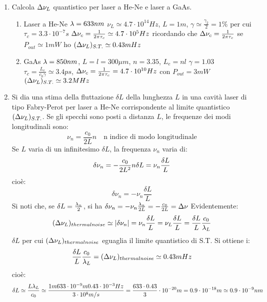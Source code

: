 \begin{enumerate}
\item Calcola $\Delta\nu_L$ quantistico per laser a He-Ne e laser a GaAs.
\begin{enumerate}
\item Laser a He-Ne $\lambda = 633nm$ $\nu_L \simeq 4.7\cdot 10^{14} Hz$, $L = 1m$, $\gamma \simeq \frac{\gamma_2}{2} = 1\%$ per cui $\tau_c = 3.3 \cdot 10^{-7} s$ $\Delta\nu_c = \frac{1}{2\pi \tau_c} \simeq 4.7 \cdot 10^5 Hz$ ricordando che $\Delta\nu_c = \frac{1}{2\pi\tau_c}$ se $P_{out} \simeq 1mW$ ho $(\Delta\nu_L)_{S.T.} \simeq 0.43 mHz$
\item GaAs $\lambda = 850 nm$, $L = l = 300 \mu m$, $n= 3.35$, $L_e=nl$ $\gamma = 1.03$ $\tau_c = \frac{L_e}{c_0 \gamma} \simeq 3.4 ps$, $\Delta\nu_c = \frac{1}{2\pi \tau_c} = 4.7 \cdot 10^{10} Hz$
con $P_{out} = 3mW$ $(\Delta\nu_L)_{S.T.} \simeq 3.2 MHz$
\end{enumerate}
\item Si dia una stima della fluttazione $\delta L$ della lunghezza $L$ in una cavità laser di tipo Fabry-Perot per laser a He-Ne corrispondente al limite quantistico $(\Delta\nu_L)_{S.T.}$. Se gli specchi sono posti a distanza $L$, le frequenze dei modi longitudinali sono:
\begin{equation*}
\nu_n = \frac{c_0}{2L} n \quad \text{n indice di modo longitudinale}
\end{equation*}
Se $L$ varia di un infinitesimo $\delta L$, la frequenza $\nu_n$ varia di:
\begin{equation*}
\delta \nu_n = -\frac{c_0}{2L^2} n \delta L = \-\nu_n \frac{\delta L}{L}
\end{equation*}
cioè:
\begin{equation*}
\delta \nu_n = -\nu_n \frac{\delta L}{L}
\end{equation*}
Si noti che, se $\delta L = \frac{\lambda_n}{2}$, si ha $\delta \nu_n= - \nu_n \frac{\lambda_n}{2L} = -\frac{c_0}{2L} = \Delta \nu$
Evidentemente:
\begin{equation*}
(\Delta\nu_L)_{thermal noise} \simeq |\delta \nu_n| = \nu_n \frac{\delta L}{L} = \nu_L\frac{\delta L}{L} = \frac{\delta L}{L} \frac{c_0}{\lambda_L}
\end{equation*}
$\delta L$ per cui $(\Delta\nu_L)_{thermal noise}$ eguaglia il limite quantistico di S.T.
Si ottiene i:
\begin{equation*}
\frac{\delta L}{L} \frac{c_0}{\lambda_L} = (\Delta\nu_L)_{thermal noise} \simeq 0.43 mHz
\end{equation*}
cioè:
\begin{equation*}
\delta L \simeq \frac{L \lambda_L}{c_0} \simeq \frac{1 m 633 \cdot 10^{-9} m 0.43 \cdot 10^{-3} Hz}{3 \cdot 10^8 m/s} = \frac{633 \cdot 0.43}{3} \cdot 10^{-20} m = 0.9 \cdot 10^{-18} m \simeq 0.9 \cdot 10^{-9} nm
\end{equation*}
\end{enumerate}

